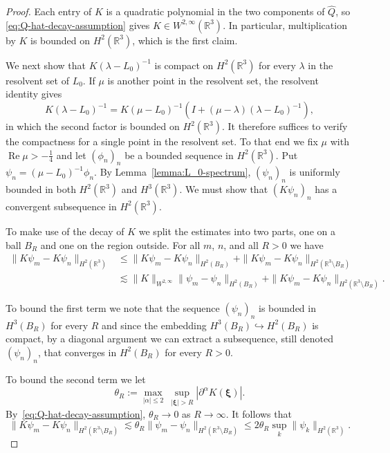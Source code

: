 \documentclass[11pt]{article}
\DeclareMathOperator{\real}{Re}
\begin{document}
\begin{proof}
  Each entry of \(K\) is a quadratic polynomial in the two components
  of \(\hat{Q}\), so \eqref{eq:Q-hat-decay-assumption} gives
  \(K \in W^{2,\infty}(\mathbb{R}^{3})\). In particular,
  multiplication by \(K\) is bounded on \(H^{2}(\mathbb{R}^{3})\),
  which is the first claim.

  We next show that \(K(\lambda - L_{0})^{-1}\) is compact on
  \(H^{2}(\mathbb{R}^{3})\) for every \(\lambda\) in the resolvent set
  of \(L_{0}\). If \(\mu\) is another point in the resolvent set, the
  resolvent identity gives
  \begin{equation}\label{eq:resolvent-identity-L_0}
    K(\lambda - L_{0})^{-1} = K(\mu - L_{0})^{-1}(I + (\mu - \lambda)(\lambda - L_{0})^{-1}),
  \end{equation}
  in which the second factor is bounded on \(H^{2}(\mathbb{R}^{3})\).
  It therefore suffices to verify the compactness for a single point
  in the resolvent set. To that end we fix \(\mu\) with
  \(\real \mu > -\frac{1}{4}\) and let \((\phi_{n})_{n}\) be a bounded
  sequence in \(H^{2}(\mathbb{R}^{3})\). Put
  \(\psi_{n} = (\mu - L_{0})^{-1}\phi_{n}\). By
  Lemma~\ref{lemma:L_0-spectrum}, \((\psi_{n})_{n}\) is uniformly
  bounded in both \(H^{2}(\mathbb{R}^{3})\) and
  \(H^{3}(\mathbb{R}^{3})\). We must show that \((K\psi_{n})_{n}\) has
  a convergent subsequence in \(H^{2}(\mathbb{R}^{3})\).

  To make use of the decay of \(K\) we split the estimates into two
  parts, one on a ball \(B_{R}\) and one on the region outside. For
  all \(m\), \(n\), and all \(R > 0\) we have
  \begin{align*}
    \|K\psi_{m} - K\psi_{n}\|_{H^{2}(\mathbb{R}^{3})}
    &\leq \|K\psi_{m} - K\psi_{n}\|_{H^{2}(B_{R})}
    + \|K\psi_{m} - K\psi_{n}\|_{H^{2}(\mathbb{R}^{3} \setminus B_{R})}\\
    &\lesssim \|K\|_{W^{2,\infty}}\|\psi_{m} - \psi_{n}\|_{H^{2}(B_{R})}
    + \|K\psi_{m} - K\psi_{n}\|_{H^{2}(\mathbb{R}^{3} \setminus B_{R})}.
  \end{align*}

  To bound the first term we note that the sequence \((\psi_{n})_{n}\)
  is bounded in \(H^{3}(B_{R})\) for every \(R\) and since the
  embedding \(H^{3}(B_{R}) \hookrightarrow H^{2}(B_{R})\) is compact,
  by a diagonal argument we can extract a subsequence, still denoted
  \((\psi_{n})_{n}\), that converges in \(H^{2}(B_{R})\) for every
  \(R > 0\).

  To bound the second term we let
  \begin{equation}\label{eq:theta_R}
    \theta_{R} := \max_{|\alpha| \leq 2}\ \sup_{|\bm{\xi}| > R} |\partial^{\alpha}K(\bm{\xi})|.
  \end{equation}
  By~\eqref{eq:Q-hat-decay-assumption}, \(\theta_{R} \to 0\) as
  \(R \to \infty\). It follows that
  \begin{equation*}
    \|K\psi_{m} - K\psi_{n}\|_{H^{2}(\mathbb{R}^{3} \setminus B_{R})}
    \lesssim \theta_{R}\|\psi_{m} - \psi_{n}\|_{H^{2}(\mathbb{R}^{3} \setminus B_{R})}
    \leq 2\theta_{R}\sup_{k}\|\psi_{k}\|_{H^{2}(\mathbb{R}^{3})}.
  \end{equation*}


\end{proof}
\end{document}
